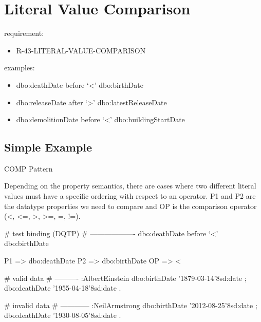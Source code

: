 \documentclass{llncs}
\begin{document}
\section{Literal Value Comparison}

requirement:

\begin{itemize}
	\item R-43-LITERAL-VALUE-COMPARISON
\end{itemize}



examples:

\begin{itemize}
	\item dbo:deathDate before ‘<’ dbo:birthDate
  \item dbo:releaseDate after ‘>’ dbo:latestReleaseDate
  \item dbo:demolitionDate before ‘<’ dbo:buildingStartDate
\end{itemize}

\subsection{Simple Example}


COMP Pattern \cite{Kontokostas2014} 

Depending on the property semantics,
there are cases where two different literal values must have
a specific ordering with respect to an operator. 
P1 and P2 are the datatype properties we need to compare and 
OP is the comparison operator (\textless, \textless=, \textgreater, \textgreater=, =, !=). 

\begin{ex}
# test binding (DQTP)
# -------------------
dbo:deathDate before ‘<’ dbo:birthDate

P1 => dbo:deathDate
P2 => dbo:birthDate
OP => <
\end{ex}

\begin{ex}
# valid data
# ----------
:AlbertEinstein
    dbo:birthDate '1879-03-14'^^xsd:date ;
    dbo:deathDate '1955-04-18'^^xsd:date .
\end{ex}

\begin{ex}
# invalid data
# ------------
:NeilArmstrong
    dbo:birthDate '2012-08-25'^^xsd:date ;
    dbo:deathDate '1930-08-05'^^xsd:date .
\end{ex}
\end{document}
